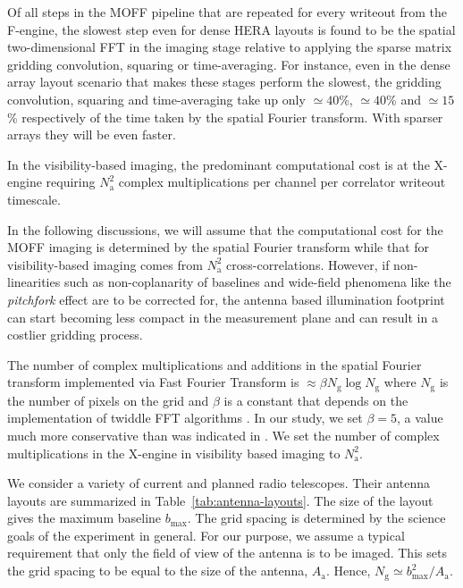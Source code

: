 \documentclass[a4paper,fleqn,usenatbib]{../mnras}
\begin{document}
Of all steps in the MOFF pipeline that are repeated for every writeout from 
the F-engine, the slowest step even for dense HERA 
layouts is found to be the spatial two-dimensional FFT in the imaging stage 
relative to applying the sparse matrix gridding convolution, squaring or 
time-averaging. For instance, even in the dense array layout scenario that 
makes these stages perform the slowest, the gridding convolution, squaring and 
time-averaging take up only $\simeq 40$\%, $\simeq 40$\% and $\simeq 15$\% 
respectively of the time taken by the spatial Fourier transform. With sparser 
arrays they will be even faster. 

In the visibility-based imaging, the predominant computational cost is at
the X-engine requiring $N_\textrm{a}^2$ complex multiplications per channel 
per correlator writeout timescale. 

In the following discussions, we will assume that the computational cost for
the MOFF imaging is determined by the spatial Fourier transform while  
that for visibility-based imaging comes from $N_\textrm{a}^2$ 
cross-correlations. However, if non-linearities such 
as non-coplanarity of baselines \citep{cor08} and wide-field phenomena like 
the {\it pitchfork} effect \citep{thy15a,thy15b} are to be corrected for, 
the antenna based illumination footprint can start becoming less compact
in the measurement plane and can result in a costlier gridding process.

The number of complex multiplications and additions in the spatial Fourier 
transform implemented via Fast Fourier Transform \citep[FFT;][]{coo65} is 
$\approx \beta N_\textrm{g}\log N_\textrm{g}$ where $N_\textrm{g}$ 
is the number of pixels on the grid and $\beta$ is a constant that depends on 
the implementation of twiddle FFT algorithms \citep{bri74}. In our study, we 
set $\beta=5$, a value much more conservative than was indicated in 
\citet{mor11}. We set the number of complex multiplications in the X-engine 
in visibility based imaging to $N_\textrm{a}^2$.

We consider a variety of current and planned radio telescopes. Their antenna 
layouts are summarized in Table~\ref{tab:antenna-layouts}. The size of the 
layout gives the maximum baseline $b_\textrm{max}$. The grid spacing is 
determined by the science goals of the experiment in general. For our 
purpose, we assume a typical requirement that only the field of view of the 
antenna is to be imaged. This sets the grid spacing to be equal to the size 
of the antenna, $A_\textrm{a}$. Hence, 
$N_\textrm{g}\simeq b_\textrm{max}^2/A_\textrm{a}$. 
\end{document}
